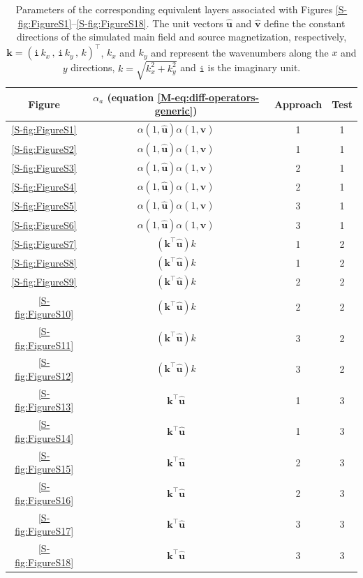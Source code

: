 \documentclass[draft,jgrga]{agutexSI2019}
\newcommand{\mainref}[1]{\ref{M-#1}}
\begin{document}
\begin{table}
	\caption{%
		Parameters of the corresponding equivalent layers associated with Figures 
		\ref{S-fig:FigureS1}--\ref{S-fig:FigureS18}. 
		The unit vectors $\hat{\mathbf{u}}$ and $\hat{\mathbf{v}}$ define the constant 
		directions of the simulated main field and source magnetization, respectively,
		$\mathbf{k} = ( \mathtt{i} \, k_{x} \, , \, \mathtt{i} \, k_{y} \, , \, k)^{\top}$,
		$k_{x}$ and $k_{y}$ and represent the wavenumbers along the $x$ and $y$
		directions, $k = \sqrt{k_{x}^{2} + k_{y}^{2}}$ and $\mathtt{i}$ is the imaginary 
		unit.
	}
	\begin{center}
		\begin{tabular}{cccc}
			{\small \textbf{Figure}} & 
			{\small $\alpha_{a}$ (equation \mainref{eq:diff-operators-generic})} & 
			{\small \textbf{Approach}} & 
			{\small \textbf{Test}} \\
			\hline
			\ref{S-fig:FigureS1} & $\alpha(1, \hat{\mathbf{u}})\alpha(1, \hat{\mathbf{v}})$ & 1 & 1 \\
			\ref{S-fig:FigureS2} & $\alpha(1, \hat{\mathbf{u}})\alpha(1, \hat{\mathbf{v}})$ & 1 & 1 \\
			\ref{S-fig:FigureS3} & $\alpha(1, \hat{\mathbf{u}})\alpha(1, \hat{\mathbf{v}})$ & 2 & 1 \\
			\ref{S-fig:FigureS4} & $\alpha(1, \hat{\mathbf{u}})\alpha(1, \hat{\mathbf{v}})$ & 2 & 1 \\
			\ref{S-fig:FigureS5} & $\alpha(1, \hat{\mathbf{u}})\alpha(1, \hat{\mathbf{v}})$ & 3 & 1 \\
			\ref{S-fig:FigureS6} & $\alpha(1, \hat{\mathbf{u}})\alpha(1, \hat{\mathbf{v}})$ & 3 & 1 \\
			\ref{S-fig:FigureS7} & $\left(\mathbf{k}^{\top}\hat{\mathbf{u}} \right) k$ & 1 & 2 \\
			\ref{S-fig:FigureS8} & $\left(\mathbf{k}^{\top}\hat{\mathbf{u}} \right) k$ & 1 & 2 \\
			\ref{S-fig:FigureS9} & $\left(\mathbf{k}^{\top}\hat{\mathbf{u}} \right) k$ & 2 & 2 \\
			\ref{S-fig:FigureS10} & $\left(\mathbf{k}^{\top}\hat{\mathbf{u}} \right) k$ & 2 & 2 \\
			\ref{S-fig:FigureS11} & $\left(\mathbf{k}^{\top}\hat{\mathbf{u}} \right) k$ & 3 & 2 \\
			\ref{S-fig:FigureS12} & $\left(\mathbf{k}^{\top}\hat{\mathbf{u}} \right) k$ & 3 & 2 \\
			\ref{S-fig:FigureS13} & $\mathbf{k}^{\top}\hat{\mathbf{u}}$ & 1 & 3 \\
			\ref{S-fig:FigureS14} & $\mathbf{k}^{\top}\hat{\mathbf{u}}$ & 1 & 3 \\
			\ref{S-fig:FigureS15} & $\mathbf{k}^{\top}\hat{\mathbf{u}}$ & 2 & 3 \\
			\ref{S-fig:FigureS16} & $\mathbf{k}^{\top}\hat{\mathbf{u}}$ & 2 & 3 \\
			\ref{S-fig:FigureS17} & $\mathbf{k}^{\top}\hat{\mathbf{u}}$ & 3 & 3 \\
			\ref{S-fig:FigureS18} & $\mathbf{k}^{\top}\hat{\mathbf{u}}$ & 3 & 3
		\end{tabular}
	\end{center}
	\label{S-tbl:TableS1}
\end{table}
\end{document}

